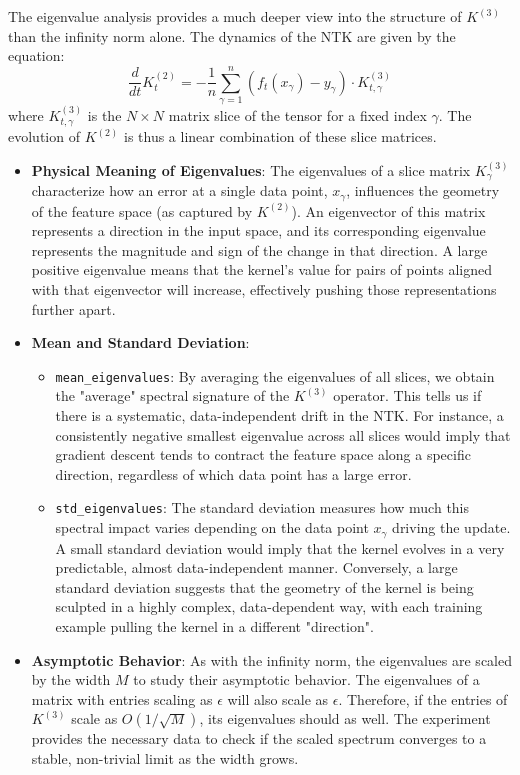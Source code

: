 \documentclass[11pt,a4paper]{article}
\begin{document}
The eigenvalue analysis provides a much deeper view into the structure of $K^{(3)}$ than the infinity norm alone. The dynamics of the NTK are given by the equation:
\[ \frac{d}{dt} K^{(2)}_t = -\frac{1}{n} \sum_{\gamma=1}^n (f_t(x_\gamma) - y_\gamma) \cdot K^{(3)}_{t, \gamma} \]
where $K^{(3)}_{t, \gamma}$ is the $N \times N$ matrix slice of the tensor for a fixed index $\gamma$. The evolution of $K^{(2)}$ is thus a linear combination of these slice matrices.

\begin{itemize}
    \item \textbf{Physical Meaning of Eigenvalues}: The eigenvalues of a slice matrix $K^{(3)}_\gamma$ characterize how an error at a single data point, $x_\gamma$, influences the geometry of the feature space (as captured by $K^{(2)}$). An eigenvector of this matrix represents a direction in the input space, and its corresponding eigenvalue represents the magnitude and sign of the change in that direction. A large positive eigenvalue means that the kernel's value for pairs of points aligned with that eigenvector will increase, effectively pushing those representations further apart.

    \item \textbf{Mean and Standard Deviation}:
    \begin{itemize}
        \item \texttt{mean\_eigenvalues}: By averaging the eigenvalues of all slices, we obtain the "average" spectral signature of the $K^{(3)}$ operator. This tells us if there is a systematic, data-independent drift in the NTK. For instance, a consistently negative smallest eigenvalue across all slices would imply that gradient descent tends to contract the feature space along a specific direction, regardless of which data point has a large error.
        \item \texttt{std\_eigenvalues}: The standard deviation measures how much this spectral impact varies depending on the data point $x_\gamma$ driving the update. A small standard deviation would imply that the kernel evolves in a very predictable, almost data-independent manner. Conversely, a large standard deviation suggests that the geometry of the kernel is being sculpted in a highly complex, data-dependent way, with each training example pulling the kernel in a different "direction".
    \end{itemize}

    \item \textbf{Asymptotic Behavior}: As with the infinity norm, the eigenvalues are scaled by the width $M$ to study their asymptotic behavior. The eigenvalues of a matrix with entries scaling as $\epsilon$ will also scale as $\epsilon$. Therefore, if the entries of $K^{(3)}$ scale as $O(1/\sqrt{M})$, its eigenvalues should as well. The experiment provides the necessary data to check if the scaled spectrum converges to a stable, non-trivial limit as the width grows.
\end{itemize}
\end{document}

